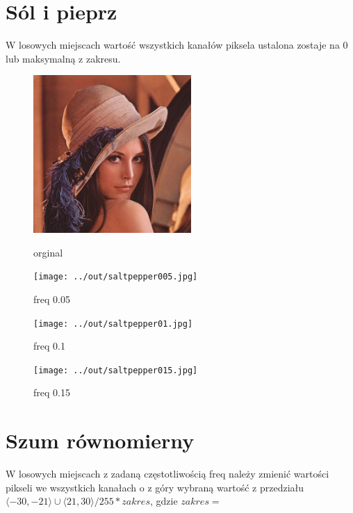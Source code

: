 \documentclass[a4paper,12pt]{article}
\begin{document}
\newpage
\section{Sól i pieprz}
W losowych miejscach wartość wszystkich kanałów piksela ustalona zostaje na 0 lub maksymalną z zakresu.



\begin{figure}[h!]
\begin{minipage}[t]{6cm}
\begin{center}
\includegraphics[width=6cm,clip]{../../lena.jpg}
\caption{orginal}
\end{center}
\end{minipage}
\hfill
\begin{minipage}[t]{6cm}
\begin{center}
\texttt{[image: ../out/saltpepper005.jpg]}
\caption{freq 0.05}
\end{center}
\end{minipage}
\end{figure}

\begin{figure}[h!]
\begin{minipage}[t]{6cm}
\begin{center}
\texttt{[image: ../out/saltpepper01.jpg]}
\caption{freq 0.1}
\end{center}
\end{minipage}
\hfill
\begin{minipage}[t]{6cm}
\begin{center}
\texttt{[image: ../out/saltpepper015.jpg]}
\caption{freq 0.15}
\end{center}
\end{minipage}
\end{figure}


\section{Szum równomierny}
W losowych miejscach z zadaną częstotliwością freq należy zmienić wartości pikseli we wszystkich kanałach o z góry wybraną wartość z przedziału $ \langle -30, -21 \rangle \cup \langle 21, 30 \rangle / 255 * zakres $, gdzie $zakres = $
\end{document}
